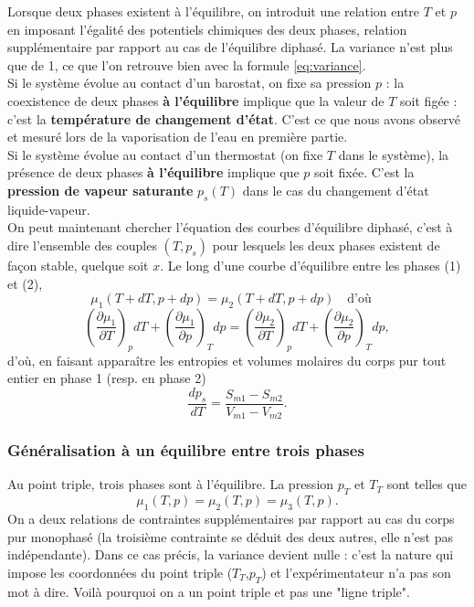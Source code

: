 \documentclass[11pt,a4paper]{report}
\begin{document}
Lorsque deux phases existent à l'équilibre, on introduit une relation entre $T$ et $p$ en imposant l'égalité des potentiels chimiques des deux phases, relation supplémentaire par rapport au cas de l'équilibre diphasé. La variance n'est plus que de 1, ce que l'on retrouve bien avec la formule \eqref{eq:variance}.\\
Si le système évolue au contact d'un barostat, on fixe sa pression $p$ : la coexistence de deux phases \textbf{à l'équilibre} implique que la valeur de $T$ soit figée : c'est la \textbf{température de changement d'état}. C'est ce que nous avons observé et mesuré lors de la vaporisation de l'eau en première partie.\\
Si le système évolue au contact d'un thermostat (on fixe $T$ dans le système), la présence de deux phases \textbf{à l'équilibre} implique que $p$ soit fixée. C'est la \textbf{pression de vapeur saturante} $p_s(T)$ dans le cas du changement d'état liquide-vapeur.\\

On peut maintenant chercher l'équation des courbes d'équilibre diphasé, c'est à dire l'ensemble des couples $(T,p_s)$ pour lesquels les deux phases existent de façon stable, quelque soit $x$. Le long d'une courbe d'équilibre entre les phases (1) et (2),
\begin{equation}
	\mu_1(T+dT,p+dp) = \mu_2(T+dT,p+dp)\quad\text{d'où}\quad
\end{equation}
\begin{equation}
	\left(\frac{\partial \mu_1}{\partial T}\right)_p dT 
	+ \left(\frac{\partial \mu_1}{\partial p}\right)_ T dp 
	= \left(\frac{\partial \mu_2}{\partial T}\right)_p dT 
	+ \left(\frac{\partial \mu_2}{\partial p}\right)_ T dp,
\end{equation}
d'où, en faisant apparaître les entropies et volumes molaires du corps pur tout entier en phase 1 (resp. en phase 2)
\begin{equation}
	\boxed{\frac{dp_s}{dT} = \frac{S_{m1} - S_{m2}}{V_{m1} - V_{m2}}}.
	\label{eq_protoclapeyron}
\end{equation}
\subsubsection*{Généralisation à un équilibre entre trois phases}

Au point triple, trois phases sont à l'équilibre. La pression $p_T$ et $T_T$ sont telles que
\begin{equation}
	\boxed{\mu_1(T,p) = \mu_2(T,p) = \mu_3(T,p)}.
\end{equation}
On a deux relations de contraintes supplémentaires par rapport au cas du corps pur monophasé (la troisième contrainte se déduit des deux autres, elle n'est pas indépendante). Dans ce cas précis, la variance devient nulle : c'est la nature qui impose les coordonnées du point triple ($T_T$,$p_T$) et l'expérimentateur n'a pas son mot à dire. Voilà pourquoi on a un point triple et pas une "ligne triple".
\end{document}
